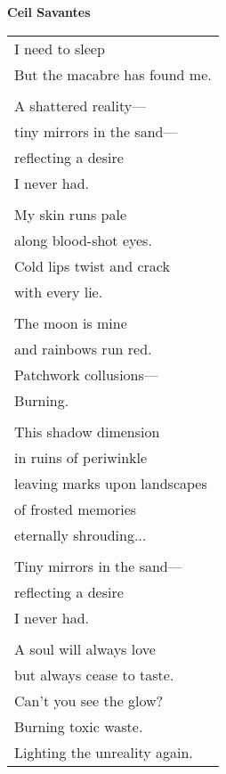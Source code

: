 \documentclass{article}
\begin{document}
\begin{center}
\textbf{Ceil Savantes} \\ %
\vspace*{2ex}
\begin{tabular}{l}
I need to sleep \\
But the macabre has found me. \\
\\
A shattered reality--- \\
tiny mirrors in the sand--- \\
reflecting a desire \\
I never had. \\
\\
My skin runs pale \\
along blood-shot eyes. \\
Cold lips twist and crack \\
with every lie. \\
\\
The moon is mine \\
and rainbows run red. \\
Patchwork collusions--- \\
Burning. \\
\\
This shadow dimension \\
in ruins of periwinkle \\
leaving marks upon landscapes \\
of frosted memories \\
eternally shrouding... \\
\\
Tiny mirrors in the sand--- \\
reflecting a desire \\
I never had. \\
\\
A soul will always love \\
but always cease to taste. \\
Can't you see the glow? \\
Burning toxic waste. \\
Lighting the unreality again. \\

\end{tabular}
\end{center}
\end{document}

